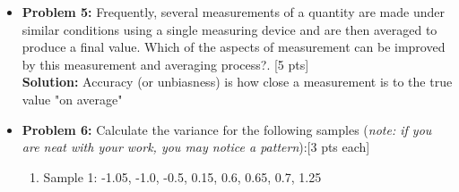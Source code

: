 \documentclass[11pt]{article}\usepackage[]{graphicx}\usepackage[]{color}
\begin{document}
\begin{itemize}
\item \textbf{Problem 5: }Frequently, several measurements of a quantity are made
	under similar conditions using a single measuring device and are
	then averaged to produce a final value. Which of the aspects of
	measurement  can be improved by this measurement and averaging process?. [5 pts] \\
\textbf{Solution:} Accuracy (or unbiasness) is how close a measurement is to the true value "on average"
	
	
	
	


\item \textbf{Problem 6:} Calculate the variance for the following samples (\textit{note: if you are neat with your work, you may notice a pattern}):[3 pts each]
\begin{enumerate}
	\item Sample 1: -1.05, -1.0, -0.5, 0.15, 0.6, 0.65, 0.7, 1.25\\
	

\end{enumerate}
\end{itemize}
\end{document}
